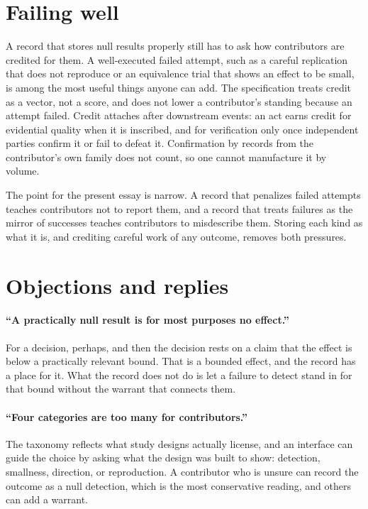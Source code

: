 \documentclass[11pt]{article}
\begin{document}
\section{Failing well}\label{sec:credit}

A record that stores null results properly still has to ask how contributors are credited for them. A well-executed failed attempt, such as a careful replication that does not reproduce or an equivalence trial that shows an effect to be small, is among the most useful things anyone can add. The specification treats credit as a vector, not a score, and does not lower a contributor's standing because an attempt failed. Credit attaches after downstream events: an act earns credit for evidential quality when it is inscribed, and for verification only once independent parties confirm it or fail to defeat it. Confirmation by records from the contributor's own family does not count, so one cannot manufacture it by volume.

The point for the present essay is narrow. A record that penalizes failed attempts teaches contributors not to report them, and a record that treats failures as the mirror of successes teaches contributors to misdescribe them. Storing each kind as what it is, and crediting careful work of any outcome, removes both pressures.

\section{Objections and replies}\label{sec:objections}

\paragraph{``A practically null result is for most purposes no effect.''} For a decision, perhaps, and then the decision rests on a claim that the effect is below a practically relevant bound. That is a bounded effect, and the record has a place for it. What the record does not do is let a failure to detect stand in for that bound without the warrant that connects them.

\paragraph{``Four categories are too many for contributors.''} The taxonomy reflects what study designs actually license, and an interface can guide the choice by asking what the design was built to show: detection, smallness, direction, or reproduction. A contributor who is unsure can record the outcome as a null detection, which is the most conservative reading, and others can add a warrant.
\end{document}

